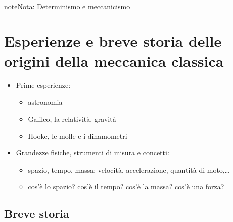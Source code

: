 \documentclass[letterpaper,10pt,italian]{jupyterBook}
\begin{document}
\begin{sphinxadmonition}{note}{Nota:}
\sphinxAtStartPar
Determinismo e meccanicismo
 
\end{sphinxadmonition}

\sphinxstepscope


\section{Esperienze e breve storia delle origini della meccanica classica}
\label{\detokenize{ch/mechanics/intro-history:esperienze-e-breve-storia-delle-origini-della-meccanica-classica}}\label{\detokenize{ch/mechanics/intro-history:physics-hs-mechanics-intro-history}}\label{\detokenize{ch/mechanics/intro-history::doc}}\begin{itemize}
\item {} 
\sphinxAtStartPar
Prime esperienze:
\begin{itemize}
\item {} 
\sphinxAtStartPar
astronomia

\item {} 
\sphinxAtStartPar
Galileo, la relatività, gravità

\item {} 
\sphinxAtStartPar
Hooke, le molle e i dinamometri

\end{itemize}

\item {} 
\sphinxAtStartPar
Grandezze fisiche, strumenti di misura e concetti:
\begin{itemize}
\item {} 
\sphinxAtStartPar
spazio, tempo, massa; velocità, accelerazione, quantità di moto,…

\item {} 
\sphinxAtStartPar
cos’è lo spazio? cos’è il tempo? cos’è la massa? cos’è una forza?

\end{itemize}

\end{itemize}


\subsection{Breve storia}
\label{\detokenize{ch/mechanics/intro-history:breve-storia}}
\end{document}
